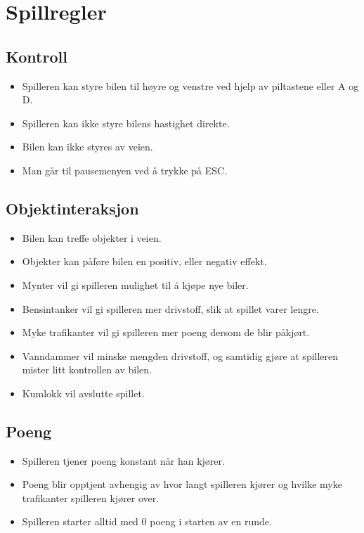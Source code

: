 \documentclass[paper=a4]{article}
\begin{document}
	\section{Spillregler}
		\subsection{Kontroll}
		\begin{itemize}
			\item{Spilleren kan styre bilen til høyre og venstre ved hjelp av piltastene eller A og D.}
			\item{Spilleren kan ikke styre bilens hastighet direkte.}
			\item{Bilen kan ikke styres av veien.}
			\item{Man går til pausemenyen ved å trykke på ESC.}
		\end{itemize}

		\subsection{Objektinteraksjon}
		\begin{itemize}
			\item{Bilen kan treffe objekter i veien.}
			\item{Objekter kan påføre bilen en positiv, eller negativ effekt.}
			\item{Mynter vil gi spilleren mulighet til å kjøpe nye biler.}
			\item{Bensintanker vil gi spilleren mer drivstoff, slik at spillet varer lengre.}
			\item{Myke trafikanter vil gi spilleren mer poeng dersom de blir påkjørt.}
			\item{Vanndammer vil minske mengden drivstoff, og samtidig gjøre at spilleren mister litt kontrollen av bilen.}
			\item{Kumlokk vil avslutte spillet.}
		\end{itemize}

		\subsection{Poeng}
		\begin{itemize}
			\item{Spilleren tjener poeng konstant når han kjører.}
			\item{Poeng blir opptjent avhengig av hvor langt spilleren kjører og hvilke myke trafikanter spilleren kjører over.}
			\item{Spilleren starter alltid med 0 poeng i starten av en runde.}
		\end{itemize}
\end{document}

